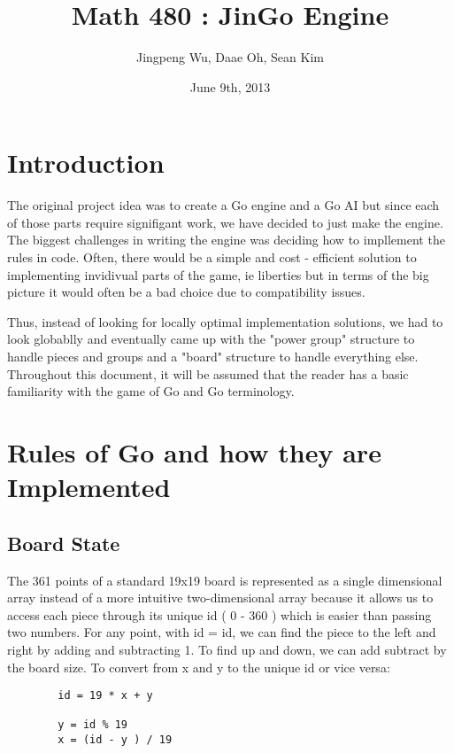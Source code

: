 \documentclass{article}
\title{Math 480 : JinGo  Engine}
\author{Jingpeng Wu, Daae Oh, Sean Kim}
\date{June 9th, 2013}
\begin{document}
\maketitle

\tableofcontents


\newpage

\section{Introduction}

The original project idea was to create a Go engine and a Go AI but since each of those parts require signifigant work, we have decided to just make the engine. The biggest challenges in writing the engine was deciding how to impllement the rules in code. Often, there would be a simple and cost - efficient solution to implementing invidivual parts of the game, ie liberties but in terms of the big picture it would often be a bad choice due to compatibility issues.

Thus, instead of looking for locally optimal implementation solutions, we had to look globablly and eventually came up with the "power group" structure to handle pieces and groups and a "board" structure to handle everything else. Throughout this document, it will be assumed that the reader has a basic familiarity with the game of Go and Go terminology.

\section{Rules of Go and how they are Implemented}\label{sec:rules}

\subsection{Board State}

    The 361 points of a standard 19x19 board is represented as a single dimensional array instead of a more intuitive two-dimensional array because it allows us to access each piece through its unique id ( 0 - 360 ) which is easier than passing two numbers. For any point, with id = id, we can find the piece to the left and right by adding and subtracting 1. To find up and down, we can add subtract by the board size. To convert from x and y to the unique id or vice versa:
\begin{verbatim}
        id = 19 * x + y

        y = id % 19
        x = (id - y ) / 19
\end{verbatim}
\end{document}
